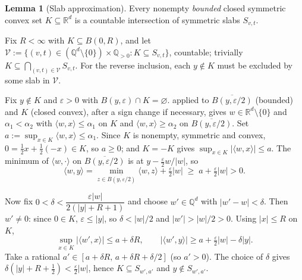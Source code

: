 \documentclass[14pt]{extarticle}
\makeatletter
\theoremstyle{definition}
\newtheorem{lemma}[theorem]{Lemma}
\renewenvironment{proof}[1][\proofname]{\par
  \pushQED{\qed}%
  \normalfont \topsep6\p@\@plus6\p@\relax
  \trivlist
  \item[\hskip\labelsep\bfseries #1\@addpunct{.}]\ignorespaces
}{%
  \popQED\endtrivlist\@endpefalse
}
\newcommand{\R}{\mathbb{R}}
\makeatother
\begin{document}
\begin{lemma}[Slab approximation]\label{lem:slab_approx}
  Every nonempty \emph{bounded} closed symmetric convex set
  $K\subseteq\R^d$ is a countable intersection of symmetric slabs
  $S_{v,t}$.
\end{lemma}

\begin{proof}
  Fix $R<\infty$ with $K\subseteq B(0,R)$, and let
  $\mathcal V:=\{(v,t)\in(\mathbb{Q}^d\setminus\{0\})\times\mathbb{Q}_{>0}:K\subseteq S_{v,t}\}$,
  countable; trivially $K\subseteq\bigcap_{(v,t)\in\mathcal V}S_{v,t}$.
  For the reverse inclusion, each $y\notin K$ must be excluded by some
  slab in $\mathcal V$.

  Fix $y\notin K$ and $\varepsilon>0$ with
  $B(y,\varepsilon)\cap K=\varnothing$.   applied
  to $\overline{B(y,\varepsilon/2)}$ (bounded) and $K$ (closed convex),
  after a sign change if necessary, gives $w\in\R^d\setminus\{0\}$ and
  $\alpha_1<\alpha_2$ with $\langle w,x\rangle\leqslant\alpha_1$ on $K$
  and $\langle w,x\rangle\geqslant\alpha_2$ on
  $\overline{B(y,\varepsilon/2)}$.  Set
  $a:=\sup_{x\in K}\langle w,x\rangle\leqslant\alpha_1$.  Since $K$ is
  nonempty, symmetric and convex, $0=\tfrac12 x+\tfrac12(-x)\in K$, so
  $a\geqslant 0$; and $K=-K$ gives
  $\sup_{x\in K}|\langle w,x\rangle|\leqslant a$.  The minimum of
  $\langle w,\cdot\rangle$ on $\overline{B(y,\varepsilon/2)}$ is at
  $y-\tfrac{\varepsilon}{2}w/|w|$, so
  \[
    \langle w,y\rangle
    =\min_{z\in\overline{B(y,\varepsilon/2)}}\langle w,z\rangle
      +\tfrac{\varepsilon}{2}|w|
    \;\geqslant\;a+\tfrac{\varepsilon}{2}|w|>0.
  \]

  Now fix $0<\delta<\dfrac{\varepsilon|w|}{2(|y|+R+1)}$ and choose
  $w'\in\mathbb{Q}^d$ with $|w'-w|<\delta$.  Then $w'\neq 0$: since
  $0\in K$, $\varepsilon\leqslant|y|$, so $\delta<|w|/2$ and
  $|w'|>|w|/2>0$.  Using $|x|\leqslant R$ on $K$,
  \[
    \sup_{x\in K}|\langle w',x\rangle|
    \leqslant a+\delta R,\qquad
    |\langle w',y\rangle|\geqslant a+\tfrac{\varepsilon}{2}|w|-\delta|y|.
  \]
  Take a rational $a'\in[a+\delta R,\,a+\delta R+\delta/2]$ (so
  $a'>0$).  The choice of $\delta$ gives
  $\delta(|y|+R+\tfrac12)<\tfrac{\varepsilon}{2}|w|$, hence
  $K\subseteq S_{w',a'}$ and $y\notin S_{w',a'}$.
\end{proof}
\end{document}
